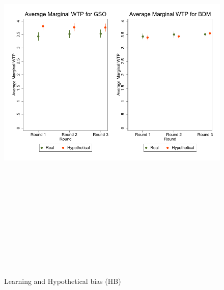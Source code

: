 \documentclass[12pt]{article}
\begin{document}
\begin{figure}[H]
    \centering
     \includegraphics[width=15cm, height=20cm]{Hypo_bias_quarBDMvsGSO_graph.pdf}
    \caption{Learning and Hypothetical bias (HB)}
    \label{fig:Learning}
\end{figure}
\end{document}
